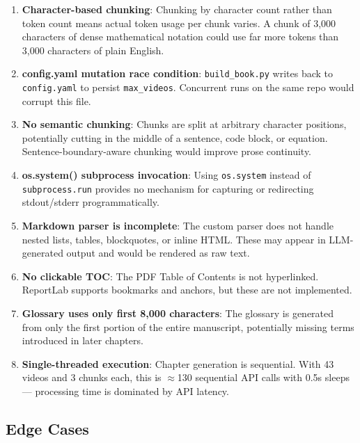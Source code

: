\documentclass[11pt,a4paper]{article}
\begin{document}
\begin{enumerate}[leftmargin=1.5em]
    \item \textbf{Character-based chunking}: Chunking by character count rather than token count means actual token usage per chunk varies. A chunk of 3,000 characters of dense mathematical notation could use far more tokens than 3,000 characters of plain English.

    \item \textbf{config.yaml mutation race condition}: \texttt{build\_book.py} writes back to \texttt{config.yaml} to persist \texttt{max\_videos}. Concurrent runs on the same repo would corrupt this file.

    \item \textbf{No semantic chunking}: Chunks are split at arbitrary character positions, potentially cutting in the middle of a sentence, code block, or equation. Sentence-boundary-aware chunking would improve prose continuity.

    \item \textbf{os.system() subprocess invocation}: Using \texttt{os.system} instead of \texttt{subprocess.run} provides no mechanism for capturing or redirecting stdout/stderr programmatically.

    \item \textbf{Markdown parser is incomplete}: The custom parser does not handle nested lists, tables, blockquotes, or inline HTML. These may appear in LLM-generated output and would be rendered as raw text.

    \item \textbf{No clickable TOC}: The PDF Table of Contents is not hyperlinked. ReportLab supports bookmarks and anchors, but these are not implemented.

    \item \textbf{Glossary uses only first 8,000 characters}: The glossary is generated from only the first portion of the entire manuscript, potentially missing terms introduced in later chapters.

    \item \textbf{Single-threaded execution}: Chapter generation is sequential. With 43 videos and 3 chunks each, this is $\approx$130 sequential API calls with 0.5s sleeps --- processing time is dominated by API latency.
\end{enumerate}

\subsection{Edge Cases}
\end{document}
